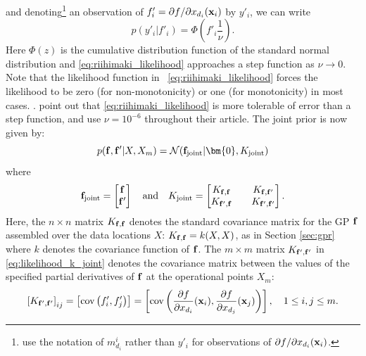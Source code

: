 and denoting\footnote{ use the notation of $m_{d_i}^i$ rather than $y'_i$ for observations of ${\partial f}/{\partial x_{d_i}} (\bold{x}_i)$. }
an observation of $f'_i = {\partial f}/{\partial x_{d_i}} (\bold{x}_i)$ by $y'_i$,  we can write
\begin{equation}\label{eq:riihimaki_likelihood}
p\left(y'_i\big|f'_i \right) = \Phi\left(f'_i\frac{1}{\nu}\right).
\end{equation}
Here $\Phi(z)$ is the cumulative distribution function of the standard normal distribution and \eqref{eq:riihimaki_likelihood} approaches a step function as  $\nu \rightarrow 0$. 
Note that the likelihood function in ~\eqref{eq:riihimaki_likelihood} forces the likelihood to be zero (for non-monotonicity) or one (for monotonicity) in most cases. .  point out that \eqref{eq:riihimaki_likelihood} is more tolerable of error than a step function, and use $\nu = 10^{-6}$ throughout their article. 
The joint prior is now given by: 
\begin{equation} 
p(\bold{f},\bold{f}'|X,X_m)=\mathcal{N}( \bold{f}_{\text{joint}} | \bm{0} , K_{\text{joint}} )
\end{equation} 
where
\begin{equation}\label{eq:likelihood_k_joint}
\bold{f}_{\text{joint}}=
\begin{bmatrix}
\bold{f} \\
\bold{f'} \\		
\end{bmatrix}
\quad \text{and} \quad
K_{\text{joint}}=
\begin{bmatrix}
K_{\bold{f,f}} &&  K_{\bold{f,f'}} \\
K_{\bold{f',f}} &&  K_{\bold{f',f'}} \\		
\end{bmatrix}.
\end{equation}
Here, the $n \times n$ matrix $K_{\bold{f,f}}$ denotes the standard covariance matrix for the GP $\bold{f}$ assembled over the data locations $X$: $K_{\bold{f,f}} = k(X,X)$, as in Section \ref{sec:gpr} where $k$ denotes the covariance function of $\bold{f}$. 
The $m \times m$ matrix $K_{\bold{f',f'}}$ in \eqref{eq:likelihood_k_joint} denotes the covariance matrix between the values of the specified partial derivatives of $\bold{f}$ at the operational points 
$X_m$:
\begin{equation}
\left[K_{\bold{f',f'}}\right]_{ij} = 
\left[
\text{cov}\left(
f'_i,
f'_j
\right)
\right]
=
\left[
\text{cov}\left(
\frac{\partial f}{\partial x_{d_i}}(\bold{x}_i),
\frac{\partial f}{\partial x_{d_j}}(\bold{x}_j)
\right)
\right], \quad
1 \le i,j \le m.
\end{equation}
